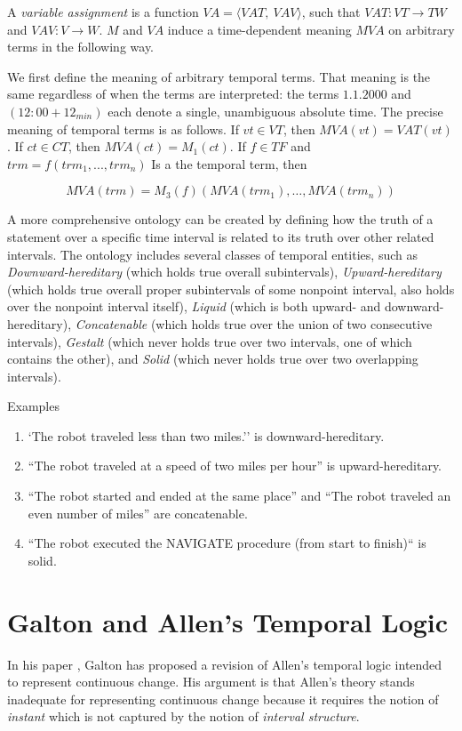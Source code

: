 A \textit{variable assignment} is a function $ VA = \langle VAT,\ VAV \rangle$, such that $VAT: VT \to TW$ and
$VAV: V \to W$. $M$ and $VA$ induce a time-dependent meaning $MVA$ on arbitrary terms in the following way.

We first define the meaning of arbitrary temporal terms. That meaning is the same regardless of when the terms are interpreted: the terms $1.1.2000$ and
$(12:00 + 12_{min})$ each denote a single, unambiguous absolute time. The precise
meaning of temporal terms is as follows. If $vt \in VT $, then $MVA (vt) = VAT (vt)$.
If $ct \in CT$, then $MVA (ct) = M_1(ct)$. If $f \in T F$ and $trm = f(trm_1, . . . , trm_n)$ Is a
the temporal term, then

\[
	MVA(trm) = M_3(f)(MVA(trm_1), \dots, MVA(trm_n))
\]

A more comprehensive ontology can be created by defining how the truth of a statement over a specific time interval is related to its truth over other related intervals.
The ontology includes several classes of temporal entities, such as \textit{Downward-hereditary} (which holds true overall subintervals), \textit{Upward-hereditary} (which holds true overall proper subintervals of some nonpoint interval, also holds over the nonpoint interval itself),
\textit{Liquid} (which is both upward- and downward-hereditary), \textit{Concatenable} (which holds true over the union of two consecutive intervals),
\textit{Gestalt} (which never holds true over two intervals, one of which contains the other), and \textit{Solid} (which never holds true over two overlapping intervals).

\begin{exmp} Examples
	\begin{enumerate}
		\item `The robot traveled less than two miles.'' is downward-hereditary.
		\item ``The robot traveled at a speed of two miles per hour'' is upward-hereditary.
		\item ``The robot started and ended at the same place'' and ``The robot traveled an even number of miles'' are concatenable.
		\item ``The robot executed the NAVIGATE procedure (from start to finish)`` is solid.
	\end{enumerate}
\end{exmp}


\section{Galton and Allen's Temporal Logic}
In his paper \cite{galton2004}, Galton has proposed a revision of Allen's temporal logic intended to represent continuous change.
His argument is that Allen's theory stands inadequate for representing continuous change because it requires the notion of \textit{instant} which is not captured by the notion of \textit{interval structure}.

